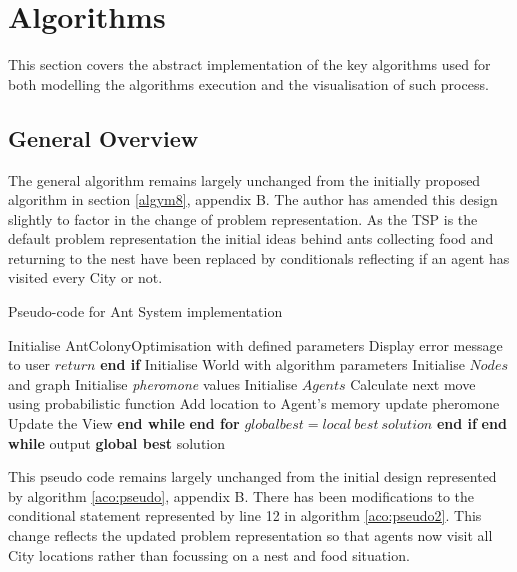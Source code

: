 \section{Algorithms}

This section covers the abstract implementation of the key algorithms used for both modelling the algorithms execution and the visualisation of such process.

\subsection{General Overview}

The general algorithm remains largely unchanged from the initially proposed algorithm in section \ref{algym8}, appendix B. The author has amended this design slightly to factor in the change of problem representation. As the TSP is the default problem representation the initial ideas behind ants collecting food and returning to the nest have been replaced by conditionals reflecting if an agent has visited every City or not.

\begin{algorithm}[H]
\caption[Ant System Pseudo-code]{Pseudo-code for Ant System implementation}
\label{aco:pseudo2}
\begin{algorithmic}[1]
\State Initialise AntColonyOptimisation with defined parameters
\State Display error message to user
\State $return$
\EndIf 
\State \textbf{end if}
\State Initialise World with algorithm parameters
\State Initialise $Nodes$ and graph
\State Initialise \textit{pheromone} values
\State Initialise $Agents$
\State Calculate next move using probabilistic function 
\State Add location to Agent's memory
\State update pheromone
\State Update the View
\EndWhile 
\State \textbf{end while}
\EndFor 
\State \textbf{end for}
\EndWhile
{}
\State $global best = local\ best\ solution$
\EndIf
\State \textbf{end if}
\State \textbf{end while}
\State output \textbf{global best} solution
\end{algorithmic}
\end{algorithm}

This pseudo code remains largely unchanged from the initial design represented by algorithm \ref{aco:pseudo}, appendix B. There has been modifications to the conditional statement represented by line 12 in algorithm \ref{aco:pseudo2}. This change reflects the updated problem representation so that agents now visit all City locations rather than focussing on a nest and food situation.

